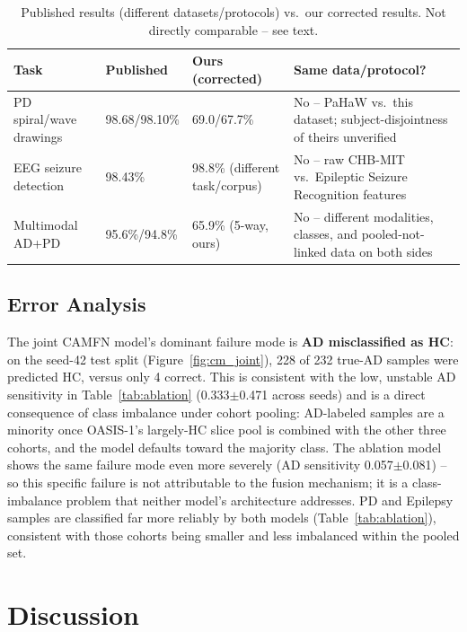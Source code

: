 \documentclass[conference]{IEEEtran}
\begin{document}
\begin{table}[t]
\centering
\caption{Published results (different datasets/protocols) vs.\ our corrected results. Not directly comparable -- see text.}
\label{tab:comparison}
\small
\begin{tabular}{p{3cm}p{2.2cm}p{2.8cm}p{8.5cm}}
\toprule
\textbf{Task} & \textbf{Published} & \textbf{Ours (corrected)} & \textbf{Same data/protocol?} \\
\midrule
PD spiral/wave drawings & 98.68/98.10\% \cite{razaq2025efficientnetv2s} & 69.0/67.7\% & No -- PaHaW vs.\ this dataset; subject-disjointness of theirs unverified \\
EEG seizure detection & 98.43\% \cite{cao2025hybridcnnbilstm} & 98.8\% (different task/corpus) & No -- raw CHB-MIT vs.\ Epileptic Seizure Recognition features \\
Multimodal AD+PD & 95.6\%/94.8\% \cite{shivahare2026attention} & 65.9\% (5-way, ours) & No -- different modalities, classes, and pooled-not-linked data on both sides \\
\bottomrule
\end{tabular}
\end{table}

\subsection{Error Analysis}
\label{sec:error}
The joint CAMFN model's dominant failure mode is \textbf{AD misclassified
as HC}: on the seed-42 test split (Figure~\ref{fig:cm_joint}), 228 of 232
true-AD samples were predicted HC, versus only 4 correct. This is
consistent with the low, unstable AD sensitivity in
Table~\ref{tab:ablation} (0.333$\pm$0.471 across seeds) and is a direct
consequence of class imbalance under cohort pooling: AD-labeled samples
are a minority once OASIS-1's largely-HC slice pool is combined with the
other three cohorts, and the model defaults toward the majority class.
The ablation model shows the same failure mode even more severely
(AD sensitivity 0.057$\pm$0.081) -- so this specific failure is not
attributable to the fusion mechanism; it is a class-imbalance problem
that neither model's architecture addresses. PD and Epilepsy samples are
classified far more reliably by both models (Table~\ref{tab:ablation}),
consistent with those cohorts being smaller and less imbalanced within
the pooled set.

\section{Discussion}
\label{sec:discussion}
\end{document}

